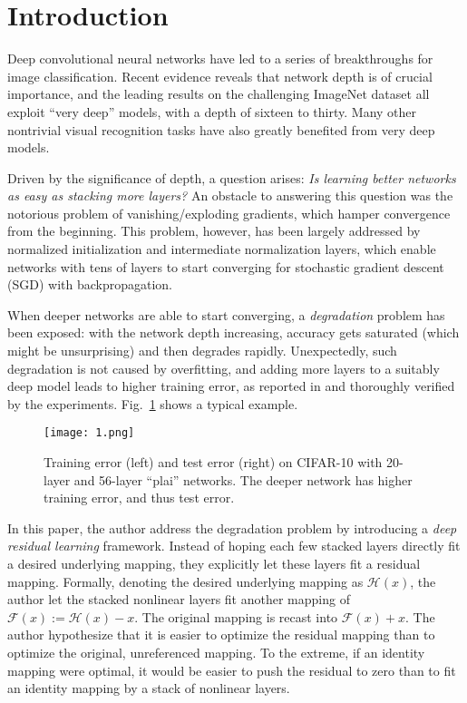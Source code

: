 \documentclass[10pt,twocolumn,letterpaper]{article}
\begin{document}
\section{Introduction}
Deep convolutional neural networks \cite{Krizhevsky2012ImageNet} have led to a series of breakthroughs for image classification. Recent evidence reveals that network depth is of crucial importance, and the leading results on the challenging ImageNet dataset all exploit ``very deep'' models, with a depth of sixteen to thirty. Many other nontrivial
visual recognition tasks \cite{He2015Spatial} have also greatly benefited from very deep models.
\par
Driven by the significance of depth, a question arises: \emph{Is learning better networks as easy as stacking more layers?} An obstacle to answering this question was the notorious problem of vanishing/exploding gradients, which hamper convergence from the beginning. This problem, however, has been largely addressed by normalized initialization and intermediate normalization layers, which enable networks with tens of layers to start converging for stochastic gradient descent (SGD) with backpropagation.
\par
When deeper networks are able to start converging, a \emph{degradation} problem has been exposed: with the network
depth increasing, accuracy gets saturated (which might be unsurprising) and then degrades rapidly. Unexpectedly, such degradation is not caused by overfitting, and adding more layers to a suitably deep model leads to higher training error, as reported in \cite{He2015Convolutional} and thoroughly verified by the experiments. Fig.~\ref{1} shows a typical example.
\begin{figure}
\begin{center}
  \texttt{[image: 1.png]}\\
  \caption{Training error (left) and test error (right) on CIFAR-10 with 20-layer and 56-layer ``plai'' networks. The deeper network has higher training error, and thus test error.}\label{1}
\end{center}
\end{figure}
\par
In this paper, the author address the degradation problem by introducing a \emph{deep residual learning} framework. Instead
of hoping each few stacked layers directly fit a desired underlying mapping, they explicitly let these layers fit a residual mapping. Formally, denoting the desired underlying mapping as $\mathcal{H}(x)$, the author let the stacked nonlinear layers fit another mapping of $\mathcal{F}(x):=\mathcal{H}(x)-x$. The original mapping is recast into $\mathcal{F}(x)+x$. The author hypothesize that it is easier to optimize the residual mapping than to optimize the original, unreferenced mapping. To the extreme, if an identity mapping were optimal, it would be easier to push the residual to zero than to fit an identity mapping by a stack of nonlinear layers.
\end{document}
